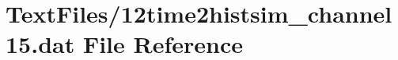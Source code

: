 \hypertarget{12time2histsim__channel15_8dat}{}\section{Text\+Files/12time2histsim\+\_\+channel15.dat File Reference}
\label{12time2histsim__channel15_8dat}
